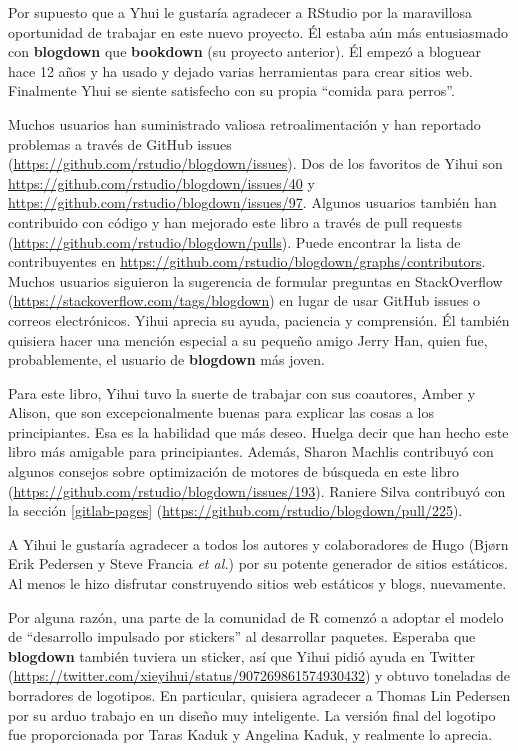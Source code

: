 \documentclass[12pt,]{krantz}
\theoremstyle{definition}
\theoremstyle{definition}
\theoremstyle{definition}
\theoremstyle{remark}
\begin{document}
Por supuesto que a Yhui le gustaría agradecer a RStudio por la
maravillosa oportunidad de trabajar en este nuevo proyecto. Él estaba
aún más entusiasmado con \textbf{blogdown} que \textbf{bookdown} (su
proyecto anterior). Él empezó a bloguear hace 12 años y ha usado y
dejado varias herramientas para crear sitios web. Finalmente Yhui se
siente satisfecho con su propia ``comida para perros''.

Muchos usuarios han suministrado valiosa retroalimentación y han
reportado problemas a través de GitHub issues
(\url{https://github.com/rstudio/blogdown/issues}). Dos de los favoritos
de Yihui son \url{https://github.com/rstudio/blogdown/issues/40} y
\url{https://github.com/rstudio/blogdown/issues/97}. Algunos usuarios
también han contribuido con código y han mejorado este libro a través de
pull requests (\url{https://github.com/rstudio/blogdown/pulls}). Puede
encontrar la lista de contribuyentes en
\url{https://github.com/rstudio/blogdown/graphs/contributors}. Muchos
usuarios siguieron la sugerencia de formular preguntas en StackOverflow
(\url{https://stackoverflow.com/tags/blogdown}) en lugar de usar GitHub
issues o correos electrónicos. Yihui aprecia su ayuda, paciencia y
comprensión. Él también quisiera hacer una mención especial a su pequeño
amigo Jerry Han, quien fue, probablemente, el usuario de
\textbf{blogdown} más joven.

Para este libro, Yihui tuvo la suerte de trabajar con sus coautores,
Amber y Alison, que son excepcionalmente buenas para explicar las cosas
a los principiantes. Esa es la habilidad que más deseo. Huelga decir que
han hecho este libro más amigable para principiantes. Además, Sharon
Machlis contribuyó con algunos consejos sobre optimización de motores de
búsqueda en este libro
(\url{https://github.com/rstudio/blogdown/issues/193}). Raniere Silva
contribuyó con la sección \ref{gitlab-pages}
(\url{https://github.com/rstudio/blogdown/pull/225}).

A Yihui le gustaría agradecer a todos los autores y colaboradores de
Hugo (Bjørn Erik Pedersen y Steve Francia \emph{et al.}) por su potente
generador de sitios estáticos. Al menos le hizo disfrutar construyendo
sitios web estáticos y blogs, nuevamente.

Por alguna razón, una parte de la comunidad de R comenzó a adoptar el
modelo de ``desarrollo impulsado por stickers'' al desarrollar paquetes.
Esperaba que \textbf{blogdown} también tuviera un sticker, así que Yihui
pidió ayuda en Twitter
(\url{https://twitter.com/xieyihui/status/907269861574930432}) y obtuvo
toneladas de borradores de logotipos. En particular, quisiera agradecer
a Thomas Lin Pedersen por su arduo trabajo en un diseño muy inteligente.
La versión final del logotipo fue proporcionada por Taras Kaduk y
Angelina Kaduk, y realmente lo aprecia.
\end{document}
